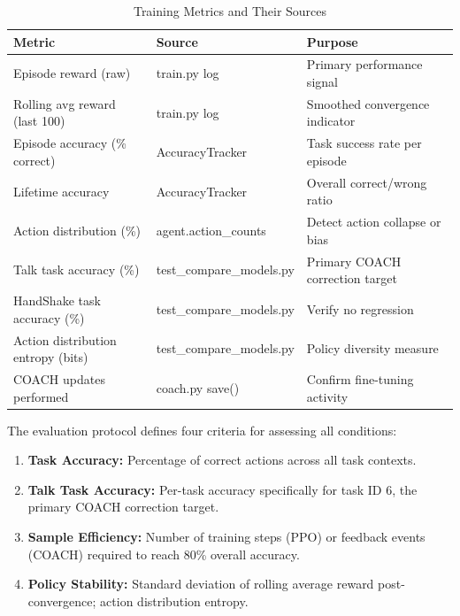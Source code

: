 \documentclass[../report.tex]{subfiles}
\begin{document}
    \begin{table}[t]
        \centering
        \caption{Training Metrics and Their Sources}
        \label{tab:metrics}
        \begin{tabular}{p{3.5cm}p{3cm}p{7cm}}
            \toprule
            \textbf{Metric} & \textbf{Source} & \textbf{Purpose} \\
            \midrule
            Episode reward (raw) & train.py log & Primary performance signal \\
            Rolling avg reward (last 100) & train.py log & Smoothed convergence indicator \\
            Episode accuracy (\% correct) & AccuracyTracker & Task success rate per episode \\
            Lifetime accuracy & AccuracyTracker & Overall correct/wrong ratio \\
            Action distribution (\%) & agent.action\_counts & Detect action collapse or bias \\
            Talk task accuracy (\%) & test\_compare\_models.py & Primary COACH correction target \\
            HandShake task accuracy (\%) & test\_compare\_models.py & Verify no regression \\
            Action distribution entropy (bits) & test\_compare\_models.py & Policy diversity measure \\
            COACH updates performed & coach.py save() & Confirm fine-tuning activity \\
            \bottomrule
        \end{tabular}
    \end{table}

    The evaluation protocol defines four criteria for assessing all conditions:

    \begin{enumerate}
        \item \textbf{Task Accuracy:} Percentage of correct actions across all task contexts.
        \item \textbf{Talk Task Accuracy:} Per-task accuracy specifically for task ID 6, the primary COACH correction target.
        \item \textbf{Sample Efficiency:} Number of training steps (PPO) or feedback events (COACH) required to reach 80\% overall accuracy.
        \item \textbf{Policy Stability:} Standard deviation of rolling average reward post-convergence; action distribution entropy.
    \end{enumerate}
\end{document}
